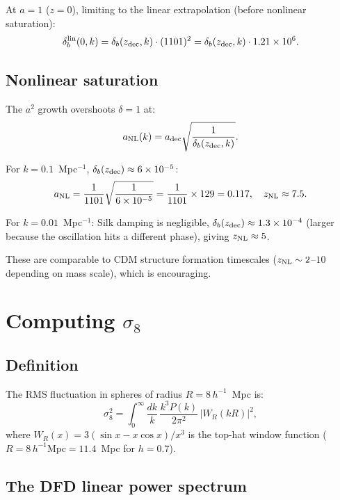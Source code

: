 \documentclass[11pt]{article}
\newcommand{\ee}[1]{\times 10^{#1}}
\begin{document}
At $a = 1$ ($z = 0$), limiting to the linear extrapolation
(before nonlinear saturation):
\begin{equation}
\delta_b^{\rm lin}(0, k) = \delta_b(z_{\rm dec}, k)\cdot(1101)^2
= \delta_b(z_{\rm dec}, k)\cdot 1.21\ee{6}.
\label{eq:delta-z0}
\end{equation}

\subsection{Nonlinear saturation}

The $a^2$ growth overshoots $\delta = 1$ at:
\begin{equation}
a_{\rm NL}(k) = a_{\rm dec}\sqrt{\frac{1}{\delta_b(z_{\rm dec}, k)}}.
\end{equation}

For $k = 0.1$~Mpc$^{-1}$, $\delta_b(z_{\rm dec}) \approx 6\ee{-5}$:
\begin{equation}
a_{\rm NL} = \frac{1}{1101}\sqrt{\frac{1}{6\ee{-5}}}
= \frac{1}{1101}\times 129 = 0.117,
\quad z_{\rm NL} \approx 7.5.
\end{equation}

For $k = 0.01$~Mpc$^{-1}$: Silk damping is negligible,
$\delta_b(z_{\rm dec}) \approx 1.3\ee{-4}$ (larger because
the oscillation hits a different phase), giving $z_{\rm NL} \approx 5$.

These are comparable to CDM structure formation timescales ($z_{\rm NL}
\sim 2$--$10$ depending on mass scale), which is encouraging.

\section{Computing $\sigma_8$}

\subsection{Definition}

The RMS fluctuation in spheres of radius $R = 8\,h^{-1}$~Mpc is:
\begin{equation}
\sigma_8^2 = \int_0^\infty \frac{dk}{k}\,\frac{k^3 P(k)}{2\pi^2}\,
|W_R(kR)|^2,
\label{eq:sigma8-def}
\end{equation}
where $W_R(x) = 3(\sin x - x\cos x)/x^3$ is the top-hat window
function ($R = 8\,h^{-1}\text{Mpc} = 11.4$~Mpc for $h = 0.7$).

\subsection{The DFD linear power spectrum}
\end{document}
